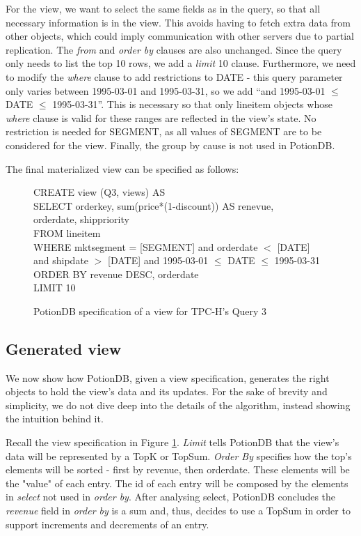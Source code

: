 \documentclass{vldb}
\begin{document}
For the view, we want to select the same fields as in the query, so that all necessary information is in the view.
This avoids having to fetch extra data from other objects, which could imply communication with other servers due to partial replication.
The \emph{from} and \emph{order by} clauses are also unchanged. %
Since the query only needs to list the top 10 rows, we add a \emph{limit} 10 clause.
Furthermore, we need to modify the \emph{where} clause to add restrictions to DATE - this query parameter only varies between 1995-03-01 and 1995-03-31, so we add ``and 1995-03-01 $\leq$ DATE $\leq$ 1995-03-31''.
This is necessary so that only lineitem objects whose \emph{where} clause is valid for these ranges are reflected in the view's state.
No restriction is needed for SEGMENT, as all values of SEGMENT are to be considered for the view.
Finally, the group by cause is not used in PotionDB.

The final materialized view can be specified as follows:

\begin{figure}[h]
	CREATE view (Q3, views) AS \\
	SELECT orderkey, sum(price*(1-discount)) AS renevue, \\
	\hphantom{SELECT }orderdate, shippriority \\
	FROM lineitem \\
	WHERE mktsegment = [SEGMENT] and orderdate $<$ [DATE] and shipdate $>$ [DATE] and 1995-03-01 $\leq$ DATE $\leq$ 1995-03-31\\
	ORDER BY revenue DESC, orderdate \\
	LIMIT 10 \\
\caption{PotionDB specification of a view for TPC-H's Query 3}
\label{fig:q3_view}
\end{figure}

\subsection{Generated view}
\label{subsec:generated_view}

We now show how PotionDB, given a view specification, generates the right objects to hold the view's data and its updates.
For the sake of brevity and simplicity, we do not dive deep into the details of the algorithm, instead showing the intuition behind it.

Recall the view specification in Figure \ref{fig:q3_view}.
\emph{Limit} tells PotionDB that the view's data will be represented by a TopK or TopSum.
\emph{Order By} specifies how the top's elements will be sorted - first by revenue, then orderdate.
These elements will be the "value" of each entry.
The id of each entry will be composed by the elements in \emph{select} not used in \emph{order by}. %
After analysing select, PotionDB concludes the \emph{revenue} field in \emph{order by} is a sum and, thus, decides to use a TopSum in order to support increments and decrements of an entry.
\end{document}
